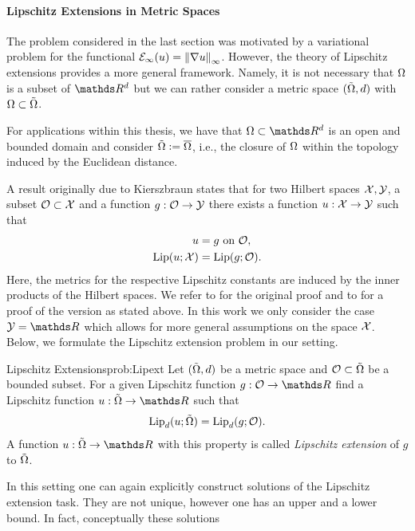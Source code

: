 \paragraph{Lipschitz Extensions in Metric Spaces} The problem considered in the last section was motivated by a variational problem for the functional  $\mathcal{E}_\infty(u)=\left\|\nabla u\right\|_\infty$. However, the theory of Lipschitz extensions provides a more general framework. Namely, it is not necessary that $\Omega$ is a subset of $\R^d$ but we can rather consider a metric space $(\tilde{\Omega},d)$ with $\Omega\subset \tilde{\Omega}$. 
%
\begin{remark}{}{}
For applications within this thesis, we have that $\domain\subset\R^d$ is an open and bounded domain and consider 
$\tilde{\Omega}:= \overline{\Omega}$, i.e., the closure of $\Omega$ within the topology induced by the Euclidean distance.
\end{remark}
%
%
%
\noindent%
A result originally due to Kierszbraun \cite{Kirszbraun1934} states that for two Hilbert spaces $\mathcal{X}, \mathcal{\mathcal{Y}}$, a subset $\mathcal{O}\subset \mathcal{X}$ and a function $g:\mathcal{O}\to \mathcal{\mathcal{Y}}$ there exists a function $u:\mathcal{X}\to \mathcal{\mathcal{Y}}$ such that 
%
\begin{align*}
u &= g \text{ on } \mathcal{O},\\
\operatorname{Lip}(u; \mathcal{X}) &= \operatorname{Lip}(g; \mathcal{O}).
\end{align*}
%
Here, the metrics for the respective Lipschitz constants are induced by the inner products of the Hilbert spaces. We refer to \cite{Kirszbraun1934} for the original proof and to \cite[Th. 1.31]{Schwartz1969} for a proof of the version as stated above.
In this work we only consider the case $\Oup=\R$ which allows for more general assumptions on the space $\mathcal{X}$. Below, we formulate the Lipschitz extension problem in our setting.
%
\begin{problem}{Lipschitz Extensions}{prob:Lipext}
Let $(\tilde{\Omega},d)$ be a metric space and $\mathcal{O}\subset \tilde{\Omega}$ be a bounded subset. For a given Lipschitz function $g:\conset\to\R$ find a Lipschitz function $u:\tilde\domain\to \R$ such that
%
\begin{align*}
\operatorname{Lip}_d(u; \tilde{\Omega}) = \operatorname{Lip}_d(g; \mathcal{O}).
\end{align*}
%
A function $u:\tilde{\domain}\to\R$ with this property is called \emph{Lipschitz extension} of 
$g$ to $\tilde{\Omega}$.
\end{problem}
%
\noindent%
In this setting one can again explicitly construct solutions of the Lipschitz extension task. They are not unique, however one has an upper and a lower bound. In fact, conceptually these solutions 
